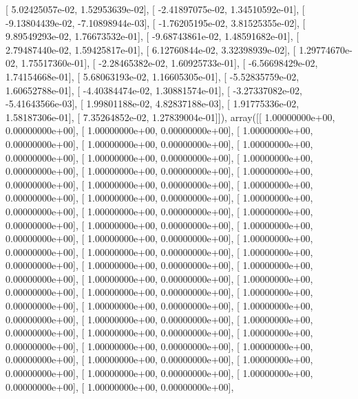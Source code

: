 \documentclass{article}
\begin{document}
       [  5.02425057e-02,   1.52953639e-02],
       [ -2.41897075e-02,   1.34510592e-01],
       [ -9.13804439e-02,  -7.10898944e-03],
       [ -1.76205195e-02,   3.81525355e-02],
       [  9.89549293e-02,   1.76673532e-01],
       [ -9.68743861e-02,   1.48591682e-01],
       [  2.79487440e-02,   1.59425817e-01],
       [  6.12760844e-02,   3.32398939e-02],
       [  1.29774670e-02,   1.75517360e-01],
       [ -2.28465382e-02,   1.60925733e-01],
       [ -6.56698429e-02,   1.74154668e-01],
       [  5.68063193e-02,   1.16605305e-01],
       [ -5.52835759e-02,   1.60652788e-01],
       [ -4.40384474e-02,   1.30881574e-01],
       [ -3.27337082e-02,  -5.41643566e-03],
       [  1.99801188e-02,   4.82837188e-03],
       [  1.91775336e-02,   1.58187306e-01],
       [  7.35264852e-02,   1.27839004e-01]]), array([[  1.00000000e+00,   0.00000000e+00],
       [  1.00000000e+00,   0.00000000e+00],
       [  1.00000000e+00,   0.00000000e+00],
       [  1.00000000e+00,   0.00000000e+00],
       [  1.00000000e+00,   0.00000000e+00],
       [  1.00000000e+00,   0.00000000e+00],
       [  1.00000000e+00,   0.00000000e+00],
       [  1.00000000e+00,   0.00000000e+00],
       [  1.00000000e+00,   0.00000000e+00],
       [  1.00000000e+00,   0.00000000e+00],
       [  1.00000000e+00,   0.00000000e+00],
       [  1.00000000e+00,   0.00000000e+00],
       [  1.00000000e+00,   0.00000000e+00],
       [  1.00000000e+00,   0.00000000e+00],
       [  1.00000000e+00,   0.00000000e+00],
       [  1.00000000e+00,   0.00000000e+00],
       [  1.00000000e+00,   0.00000000e+00],
       [  1.00000000e+00,   0.00000000e+00],
       [  1.00000000e+00,   0.00000000e+00],
       [  1.00000000e+00,   0.00000000e+00],
       [  1.00000000e+00,   0.00000000e+00],
       [  1.00000000e+00,   0.00000000e+00],
       [  1.00000000e+00,   0.00000000e+00],
       [  1.00000000e+00,   0.00000000e+00],
       [  1.00000000e+00,   0.00000000e+00],
       [  1.00000000e+00,   0.00000000e+00],
       [  1.00000000e+00,   0.00000000e+00],
       [  1.00000000e+00,   0.00000000e+00],
       [  1.00000000e+00,   0.00000000e+00],
       [  1.00000000e+00,   0.00000000e+00],
       [  1.00000000e+00,   0.00000000e+00],
       [  1.00000000e+00,   0.00000000e+00],
       [  1.00000000e+00,   0.00000000e+00],
       [  1.00000000e+00,   0.00000000e+00],
       [  1.00000000e+00,   0.00000000e+00],
       [  1.00000000e+00,   0.00000000e+00],
       [  1.00000000e+00,   0.00000000e+00],
       [  1.00000000e+00,   0.00000000e+00],
       [  1.00000000e+00,   0.00000000e+00],
       [  1.00000000e+00,   0.00000000e+00],
\end{document}
